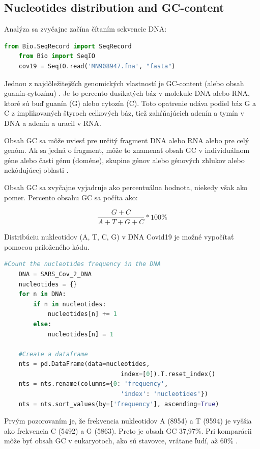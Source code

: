 \subsection{Nucleotides distribution and GC-content}

Analýza sa zvyčajne začína čítaním sekvencie DNA:
\begin{lstlisting}[language=Python, caption=Čítaníe sekvencie DNA pomocou BioPython:]
    from Bio.SeqRecord import SeqRecord
    from Bio import SeqIO
    cov19 = SeqIO.read('MN908947.fna', "fasta")
\end{lstlisting}

Jednou z najdôležitejších genomických vlastností je GC-content (alebo obsah guanín-cytozínu) \cite{gccontent2}.
Je to percento dusíkatých báz v molekule DNA alebo RNA, ktoré sú buď guanín (G) alebo cytozín (C).
Toto opatrenie udáva podiel báz G a C z implikovaných štyroch celkových báz, tiež zahŕňajúcich adenín a tymín v DNA a adenín a uracil v RNA.

Obsah GC sa môže uviesť pre určitý fragment DNA alebo RNA alebo pre celý genóm.
Ak sa jedná o fragment, môže to znamenať obsah GC v individuálnom géne alebo časti génu (doméne), skupine génov alebo génových zhlukov alebo nekódujúcej oblasti \cite{gccontent}.

Obsah GC sa zvyčajne vyjadruje ako percentuálna hodnota, niekedy však ako pomer.
Percento obsahu GC sa počíta ako:

    \[\frac{G+C}{A+T+G+C}*100\%\]

    Distribúciu nukleotidov (A, T, C, G) v DNA Covid19 je možné vypočítať pomocou priloženého kódu.
\begin{lstlisting}[language=Python, caption=Skript na výpočet distribúcie nukleotidov v genóme SARS-CoV-2.]
    #Count the nucleotides frequency in the DNA
    DNA = SARS_Cov_2_DNA
    nucleotides = {}
    for n in DNA:
        if n in nucleotides:
            nucleotides[n] += 1
        else:
            nucleotides[n] = 1

    #Create a dataframe
    nts = pd.DataFrame(data=nucleotides, 
                                index=[0]).T.reset_index()
    nts = nts.rename(columns={0: 'frequency', 
                                'index': 'nucleotides'})
    nts = nts.sort_values(by=['frequency'], ascending=True)
\end{lstlisting}

Prvým pozorovaním je, že frekvencia nukleotidov A (8954) a T (9594) je vyššia ako frekvencia C (5492) a G (5863).
Preto je obsah GC 37,97\%.
Pri komparácii môže byť obsah GC v eukaryotoch, ako sú stavovce, vrátane ľudí, až 60\% \cite{gccontent3}.

